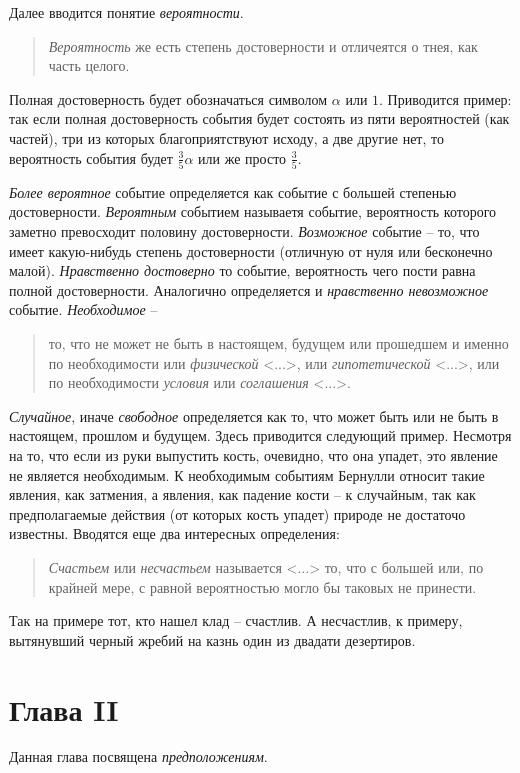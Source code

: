 \documentclass[12pt]{article}
\begin{document}
Далее вводится понятие \textit{вероятности}.
\begin{quote}
\textit{Вероятность} же есть степень достоверности и отличеятся о тнея, как часть целого.
\end{quote}
Полная достоверность будет обозначаться символом $\alpha$ или $1$. 
Приводится пример: так если полная достоверность события будет состоять из пяти вероятностей (как частей), три из которых благоприятствуют исходу, а две другие нет, то вероятность события будет $\frac{3}{5} \alpha$ или же просто $\frac{3}{5}$.

\textit{Более вероятное} событие определяется как событие с большей степенью достоверности.
\textit{Вероятным} событием называетя событие, вероятность которого заметно превосходит половину достоверности.
\textit{Возможное} событие -- то, что имеет какую-нибудь степень достоверности (отличную от нуля или бесконечно малой).
\textit{Нравственно достоверно} то событие, вероятность чего пости равна полной достоверности. 
Аналогично определяется и \textit{нравственно невозможное} событие.
\textit{Необходимое} -- 
\begin{quote}
то, что не может не быть в настоящем, будущем или прошедшем и именно по необходимости или \textit{физической} <...>, или \textit{гипотетической} <...>, или по необходимости \textit{условия} или \textit{соглашения} <...>.
\end{quote}
\textit{Случайное}, иначе \textit{свободное} определяется как то, что может быть или не быть в настоящем, прошлом и будущем.
Здесь приводится следующий пример. Несмотря на то, что если из руки выпустить кость, очевидно, что она упадет, это явление не является необходимым. К необходимым событиям Бернулли относит такие явления, как затмения, а явления, как падение кости -- к случайным, так как предполагаемые действия (от которых кость упадет) природе не достаточо известны.
Вводятся еще два интересных определения:
\begin{quote}
\textit{Счастьем} или \textit{несчастьем} называется <...> то, что с большей или, по крайней мере, с равной вероятностью могло бы таковых не принести.
\end{quote}
Так на примере тот, кто нашел клад -- счастлив. 
А несчастлив, к примеру, вытянувший черный жребий на казнь один из двадати дезертиров.

\section{Глава II}
Данная глава посвящена \textit{предположениям}.
\end{document}
